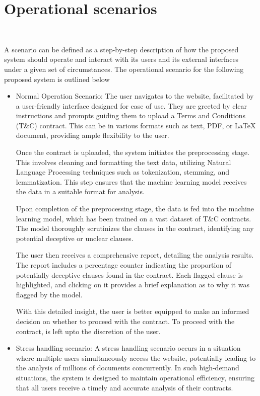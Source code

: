 \chapter{Operational scenarios 
\label{Chapter::Operational scenarios}}\

A scenario can be defined as a  step-by-step description of how the proposed system should operate and interact with its users and its
external interfaces under a given set of circumstances. The operational scenario for the following proposed system is outlined below
\begin{itemize}
    \item Normal Operation Scenario: The user navigates to the website, facilitated by a user-friendly interface designed for ease of use. They are greeted by clear instructions and prompts guiding them to upload a Terms and Conditions (T\&C) contract. This can be in various formats such as text, PDF, or LaTeX document, providing ample flexibility to the user.

Once the contract is uploaded, the system initiates the preprocessing stage. This involves cleaning and formatting the text data, utilizing Natural Language Processing techniques such as tokenization, stemming, and lemmatization. This step ensures that the machine learning model receives the data in a suitable format for analysis.

Upon completion of the preprocessing stage, the data is fed into the machine learning model, which has been trained on a vast dataset of T\&C contracts. The model thoroughly scrutinizes the clauses in the contract, identifying any potential deceptive or unclear clauses.

The user then receives a comprehensive report, detailing the analysis results. The report includes a percentage counter indicating the proportion of potentially deceptive clauses found in the contract. Each flagged clause is highlighted, and clicking on it provides a brief explanation as to why it was flagged by the model.

With this detailed insight, the user is better equipped to make an informed decision on whether to proceed with the contract. To proceed with the contract, is left upto the discretion of the user. 

\item Stress handling scenario: A stress handling scenario occurs in a situation where multiple users simultaneously access the website, potentially leading to the analysis of millions of documents concurrently. In such high-demand situations, the system is designed to maintain operational efficiency, ensuring that all users receive a timely and accurate analysis of their contracts.


\end{itemize}
